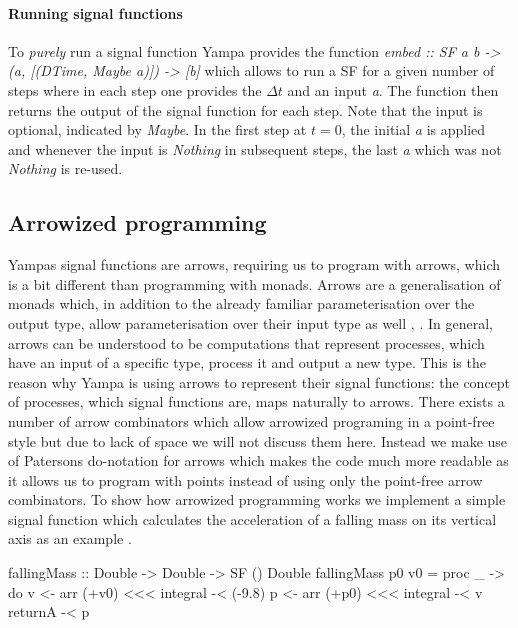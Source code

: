 \paragraph{Running signal functions}
To \textit{purely} run a signal function Yampa provides the function \textit{embed :: SF a b -> (a, [(DTime, Maybe a)]) -> [b]} which allows to run a SF for a given number of steps where in each step one provides the $\Delta t$ and an input \textit{a}. The function then returns the output of the signal function for each step. Note that the input is optional, indicated by \textit{Maybe}. In the first step at $t = 0$, the initial \textit{a} is applied and whenever the input is \textit{Nothing} in subsequent steps, the last \textit{a} which was not \textit{Nothing} is re-used.

\subsection{Arrowized programming}
Yampas signal functions are arrows, requiring us to program with arrows, which is a bit different than programming with monads. Arrows are a generalisation of monads which, in addition to the already familiar parameterisation over the output type, allow parameterisation over their input type as well \cite{hughes_generalising_2000}, \cite{hughes_programming_2005}. In general, arrows can be understood to be computations that represent processes, which have an input of a specific type, process it and output a new type. This is the reason why Yampa is using arrows to represent their signal functions: the concept of processes, which signal functions are, maps naturally to arrows. There exists a number of arrow combinators which allow arrowized programing in a point-free style but due to lack of space we will not discuss them here. Instead we make use of Patersons do-notation for arrows \cite{paterson_new_2001} which makes the code much more readable as it allows us to program with points instead of using only the point-free arrow combinators. To show how arrowized programming works we implement a simple signal function which calculates the acceleration of a falling mass on its vertical axis as an example \cite{perez_testing_2017}.

\begin{HaskellCode}
fallingMass :: Double -> Double -> SF () Double
fallingMass p0 v0 = proc _ -> do
  v <- arr (+v0) <<< integral -< (-9.8)
  p <- arr (+p0) <<< integral -< v
  returnA -< p
\end{HaskellCode}

